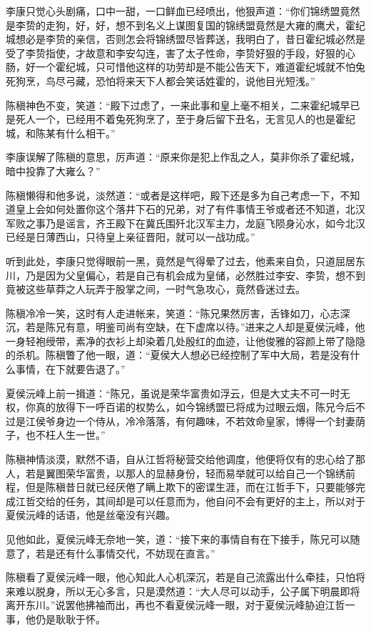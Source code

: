 李康只觉心头剧痛，口中一甜，一口鲜血已经喷出，他狠声道：“你们锦绣盟竟然是李贽的走狗，好，好，想不到名义上谋图复国的锦绣盟竟然是大雍的鹰犬，霍纪城想必是李贽的亲信，否则怎会将锦绣盟尽皆葬送，我明白了，昔日霍纪城必然是受了李贽指使，才故意和李安勾连，害了太子性命，李贽好狠的手段，好狠的心肠，好一个霍纪城，只可惜他这样的功劳却是不能公告天下，难道霍纪城就不怕兔死狗烹，鸟尽弓藏，恐怕将来天下人都会笑话姓霍的，说他目光短浅。”

陈稹神色不变，笑道：“殿下过虑了，一来此事和皇上毫不相关，二来霍纪城早已是死人一个，已经用不着兔死狗烹了，至于身后留下丑名，无言见人的也是霍纪城，和陈某有什么相干。”

李康误解了陈稹的意思，厉声道：“原来你是犯上作乱之人，莫非你杀了霍纪城，暗中投靠了大雍么？”

陈稹懒得和他多说，淡然道：“或者是这样吧，殿下还是多为自己考虑一下，不知道皇上会如何处置你这个落井下石的兄弟，对了有件事情王爷或者还不知道，北汉军败之事乃是谣言，齐王殿下在冀氏围歼北汉军主力，龙庭飞陨身沁水，如今北汉已经是日薄西山，只待皇上亲征晋阳，就可以一战功成。”

听到此处，李康只觉得眼前一黑，竟然是气得晕了过去，他素来自负，只道屈居东川，乃是因为父皇偏心，若是自己有机会成为皇储，必然胜过李安、李贽，想不到竟被这些草莽之人玩弄于股掌之间，一时气急攻心，竟然昏迷过去。

陈稹冷冷一笑，这时有人走进帐来，笑道：“陈兄果然厉害，舌锋如刀，心志深沉，若是陈兄有意，明鉴司尚有空缺，在下虚席以待。”进来之人却是夏侯沅峰，他一身轻袍绶带，素净的衣衫上却染着几处殷红的血迹，让他俊雅的容颜上带了隐隐的杀机。陈稹瞥了他一眼，道：“夏侯大人想必已经控制了军中大局，若是没有什么事情，在下就要告退了。”

夏侯沅峰上前一揖道：“陈兄，虽说是荣华富贵如浮云，但是大丈夫不可一时无权，你真的放得下一呼百诺的权势么，如今锦绣盟已将成为过眼云烟，陈兄今后不过是江侯爷身边一个侍从，冷冷落落，有何趣味，不若效命皇家，博得一个封妻荫子，也不枉人生一世。”

陈稹神情淡漠，默然不语，自从江哲将秘营交给他调度，他便将仅有的忠心给了那人，若是翼图荣华富贵，以那人的显赫身份，轻而易举就可以给自己一个锦绣前程，但是陈稹昔日就已经厌倦了瞒上欺下的密谍生涯，而在江哲手下，只要能够完成江哲交给的任务，其间却是可以任意而为，他自问不会有更好的主上，所以对于夏侯沅峰的话语，他是丝毫没有兴趣。

见他如此，夏侯沅峰无奈地一笑，道：“接下来的事情自有在下接手，陈兄可以随意了，若是还有什么事情交代，不妨现在直言。”

陈稹看了夏侯沅峰一眼，他心知此人心机深沉，若是自己流露出什么牵挂，只怕将来难以脱身，所以无心多言，只是漠然道：“大人尽可以动手，公子属下明晨即将离开东川。”说罢他拂袖而出，再也不看夏侯沅峰一眼，对于夏侯沅峰胁迫江哲一事，他仍是耿耿于怀。

